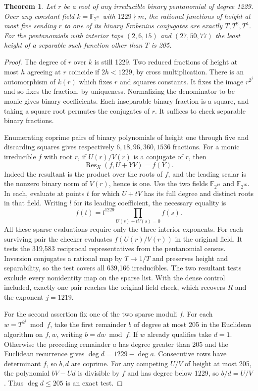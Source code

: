 \documentclass[11pt]{article}
\newtheorem{theorem}{Theorem}
\begin{document}
\begin{theorem}
Let \(r\) be a root of any irreducible binary pentanomial of degree 1229.
Over any constant field \(k=\mathbb F_{2^m}\) with \(1229\nmid m\),
the rational functions of height at most five sending \(r\) to one of
its binary Frobenius conjugates are exactly \(T,T^2,T^4\).
For the pentanomials with interior taps \((2,6,15)\) and \((27,50,77)\)
the least height of a separable such function other than \(T\) is 205.
\end{theorem}
\begin{proof}
The degree of \(r\) over \(k\) is still 1229. Two reduced fractions of
height at most \(h\) agreeing at \(r\) coincide if \(2h<1229\), by
cross multiplication. There is an automorphism of \(k(r)\) which fixes
\(r\) and squares constants. It fixes the image \(r^{2^j}\) and so
fixes the fraction, by uniqueness. Normalizing the denominator to be
monic gives binary coefficients. Each inseparable binary fraction is a
square, and taking a square root permutes the conjugates of \(r\).
It suffices to check separable binary fractions.

Enumerating coprime pairs of binary polynomials of height one through
five and discarding squares gives respectively \(6,18,96,360,1536\)
fractions. For a monic irreducible \(f\) with root \(r\), if
\(U(r)/V(r)\) is a conjugate of \(r\), then
\[
             \operatorname{Res}_X(f,U+YV)=f(Y).
\]
Indeed the resultant is the product over the roots of \(f\), and the
leading scalar is the nonzero binary norm of \(V(r)\), hence is one.
Use the two fields \(\mathbb F_{2^{12}}\) and \(\mathbb F_{2^{16}}\).
In each, evaluate at points \(t\) for which \(U+tV\) has its full
degree and distinct roots in that field. Writing \(l\) for its leading
coefficient, the necessary equality is
\[
             f(t)=l^{1229}\prod_{U(s)+tV(s)=0} f(s).
\]
All these sparse evaluations require only the three interior exponents.
For each surviving pair the checker evaluates \(f(U(r)/V(r))\) in the
original field. It tests the 319,583 reciprocal representatives from
the pentanomial census. Inversion conjugates a rational map by \(T\mapsto1/T\)
and preserves height and separability, so the test covers all 639,166
irreducibles. The two resultant tests exclude every nonidentity map on the sparse
list. With the dense control included, exactly one pair reaches the
original-field check, which recovers \(R\) and the exponent \(j=1219\).

For the second assertion fix one of the two sparse moduli \(f\). For
each \(w=T^{2^j}\bmod f\), take the first remainder \(b\) of degree at
most 205 in the Euclidean algorithm on \(f,w\), writing \(b=dw\bmod f\).
If \(w\) already qualifies take \(d=1\). Otherwise the preceding
remainder \(a\) has degree greater than 205 and the Euclidean recurrence
gives \(\deg d=1229-\deg a\). Consecutive rows have determinant \(f\),
so \(b,d\) are coprime. For any competing \(U/V\) of height at most
205, the polynomial \(bV-Ud\) is divisible by \(f\) and has degree
below 1229, so \(b/d=U/V\). Thus \(\deg d\le205\) is an exact test.


\end{proof}
\end{document}
